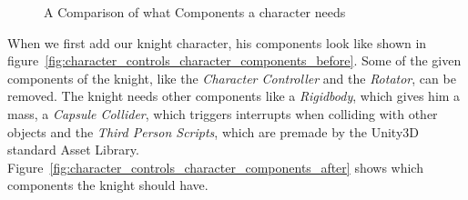 \documentclass[12pt, a4paper, titlepage]{article}
\begin{document}
\begin{figure}[htbp]
  \begin{center}
    \hspace{0.5in}
  \end{center}
  \caption{A Comparison of what Components a character needs}
  \label{fig:character_controls_character_components}
\end{figure}

When we first add our knight character, his components look like shown in  figure~\ref{fig:character_controls_character_components_before}. Some of the given components of the knight, like the \emph{Character Controller} and the \emph{Rotator}, can be removed. The knight needs other components like a \emph{Rigidbody}, which gives him a mass, a \emph{Capsule Collider}, which triggers interrupts when colliding with other objects and the \emph{Third Person Scripts}, which are premade by the Unity3D standard Asset Library. Figure~\ref{fig:character_controls_character_components_after} shows which components the knight should have.
\end{document}
